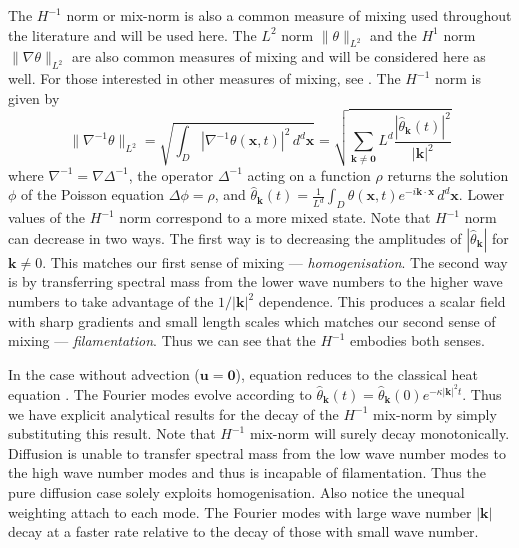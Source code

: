 \documentclass[12pt]{iopart}
\newcommand{\hmone}[1]{\|\nabla^{-1} #1\|_{L^{2}}}
\newcommand{\ltwo}[1]{\|#1\|_{L^{2}}}
\newcommand{\hone}[1]{\| \nabla #1\|_{L^{2}}}
\newcommand{\sint}[1]{\int_{D} #1 \, d^{d}\mathbf{x}}
\renewcommand{\vec}[1]{\mathbf{#1}}
\begin{document}
The $H^{-1}$ norm or mix-norm \cite{GM2005} is also a common measure of mixing used throughout the literature and will be used here. The $L^{2}$ norm $\ltwo{\theta}$ and the $H^{1}$ norm $\hone{\theta}$ are also common measures of mixing and will be considered here as well.  For those interested in other measures of mixing, see \cite{JLT2012}. The $H^{-1}$ norm is given by  
%
\begin{equation}
\hmone{\theta}=\sqrt{\sint{ |\nabla^{-1} \theta( \vec{x},t)|^2}}=\sqrt{ \sum_{\vec{k}\neq \vec{0}} L^d \frac{|\hat{\theta}_{\vec{k}}(t)|^{2}}{|\vec{k}|^2}}
\end{equation}
%
where $\nabla^{-1}=\nabla \Delta^{-1}$, the operator $\Delta^{-1}$ acting on  a function $\rho$ returns the solution $\phi$ of the Poisson equation $ \Delta \phi = \rho $, and $\hat{\theta}_{\vec{k}}(t) =  \frac{1}{L^{d}}\sint{\theta(\vec{x},t)e^{-i\vec{k}\cdot\vec{x}}}$.  Lower values of the  $H^{-1}$ norm correspond to a more mixed state. Note that $H^{-1}$ norm can decrease in two ways. The first way is to decreasing the amplitudes of $|\hat{\theta}_{\vec{k}}|$ for $\vec{k}\neq 0$. This matches our first sense of mixing --- {\it homogenisation}. The second way is by transferring spectral mass from the lower wave numbers to the higher wave numbers to take advantage of the $1/|\vec{k}|^2$ dependence. This produces a scalar field with sharp gradients and small length scales which matches our second sense of mixing --- {\it filamentation}. Thus we can see that the $H^{-1}$ embodies both senses. 

In the case without advection ($\vec{u}=\vec{0}$), equation  reduces to the classical heat equation \cite{Evans2010}. The Fourier modes evolve according to $\hat{\theta}_{\vec{k}}(t)=\hat{\theta}_{\vec{k}}(0)e^{-\kappa|\vec{k}|^2t}$. Thus we have explicit analytical results for the decay of the $H^{-1}$ mix-norm by simply substituting this result. Note that $H^{-1}$ mix-norm will surely decay monotonically. Diffusion is unable to transfer spectral mass from the low wave number modes to the high wave number modes and thus is incapable of filamentation. Thus the pure diffusion case solely exploits homogenisation. Also notice the unequal weighting attach to each mode. The Fourier modes with large wave number $|\vec{k}|$ decay at a faster rate relative to the decay of those with small wave number.


\end{document}
